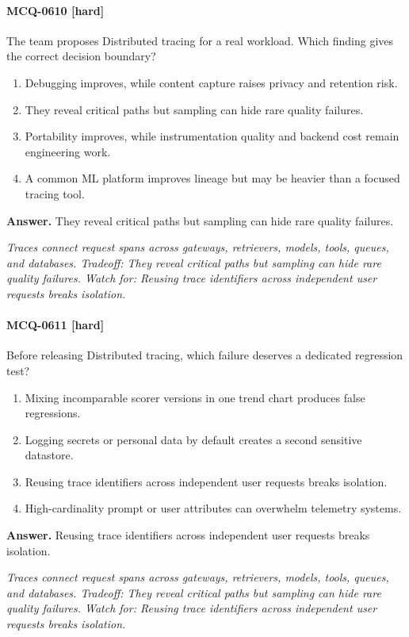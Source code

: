 \paragraph{MCQ-0610 [hard]} The team proposes Distributed tracing for a real workload. Which finding gives the correct decision boundary?
\begin{enumerate}[label=\Alph*.]
\item Debugging improves, while content capture raises privacy and retention risk.
\item They reveal critical paths but sampling can hide rare quality failures.
\item Portability improves, while instrumentation quality and backend cost remain engineering work.
\item A common ML platform improves lineage but may be heavier than a focused tracing tool.
\end{enumerate}
\noindent\textbf{Answer.} They reveal critical paths but sampling can hide rare quality failures.
\par\textit{Traces connect request spans across gateways, retrievers, models, tools, queues, and databases. Tradeoff: They reveal critical paths but sampling can hide rare quality failures. Watch for: Reusing trace identifiers across independent user requests breaks isolation.}
\paragraph{MCQ-0611 [hard]} Before releasing Distributed tracing, which failure deserves a dedicated regression test?
\begin{enumerate}[label=\Alph*.]
\item Mixing incomparable scorer versions in one trend chart produces false regressions.
\item Logging secrets or personal data by default creates a second sensitive datastore.
\item Reusing trace identifiers across independent user requests breaks isolation.
\item High-cardinality prompt or user attributes can overwhelm telemetry systems.
\end{enumerate}
\noindent\textbf{Answer.} Reusing trace identifiers across independent user requests breaks isolation.
\par\textit{Traces connect request spans across gateways, retrievers, models, tools, queues, and databases. Tradeoff: They reveal critical paths but sampling can hide rare quality failures. Watch for: Reusing trace identifiers across independent user requests breaks isolation.}
